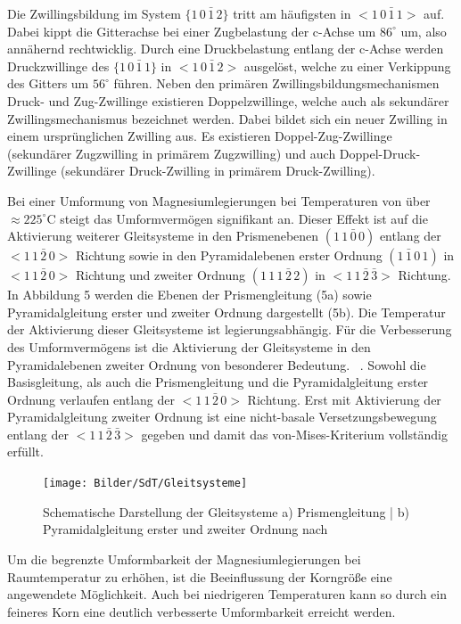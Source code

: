 Die Zwillingsbildung im System $\{1\,0\,\bar{1}\,2\}$ tritt am häufigsten in $<1\,0\,\bar{1}\,1>$ auf.
Dabei kippt die Gitterachse bei einer Zugbelastung der c-Achse um $86^\circ$ um, also annähernd rechtwicklig.
Durch eine Druckbelastung entlang der c-Achse werden Druckzwillinge des $\{1\,0\,\bar{1}\,1\}$ in $<1\,0\,\bar{1}\,2>$ ausgelöst, welche zu einer Verkippung des Gitters um $56^\circ$ führen.
Neben den primären Zwillingsbildungsmechanismen Druck- und Zug-Zwillinge existieren Doppelzwillinge, welche auch als sekundärer Zwillingsmechanismus bezeichnet werden.
Dabei bildet sich ein neuer Zwilling in einem ursprünglichen Zwilling aus.
Es existieren Doppel-Zug-Zwillinge (sekundärer Zugzwilling in primärem Zugzwilling) und auch Doppel-Druck-Zwillinge (sekundärer Druck-Zwilling in primärem Druck-Zwilling). \cite{Ullmann.2014}

Bei einer Umformung von Magnesiumlegierungen bei Temperaturen von über $\approx 225 ^\circ\text{C}$ steigt das Umformvermögen signifikant an.
Dieser Effekt ist auf die Aktivierung weiterer Gleitsysteme in den Prismenebenen $(1\,\bar{1\,0\,0})$ entlang der $<1\,1\,\bar{2}\,0>$ Richtung sowie in den Pyramidalebenen erster Ordnung $(1\,\bar{1}\,0\,1)$ in $<1\,1\,\bar{2}\,0>$ Richtung und zweiter Ordnung $(1\,1\,1\,\bar{2}\,2)$ in $<1\,1\,\bar{2}\,\bar{3}>$ Richtung.
In Abbildung 5 werden die Ebenen der Prismengleitung (5a) sowie Pyramidalgleitung erster und zweiter Ordnung dargestellt (5b).
Die Temperatur der Aktivierung dieser Gleitsysteme ist legierungsabhängig. \cite{Kammer.2000}
Für die Verbesserung des Umformvermögens ist die Aktivierung der Gleitsysteme in den Pyramidalebenen zweiter Ordnung von besonderer Bedeutung. \cite{En.2001,Doege.2010}~.
Sowohl die Basisgleitung, als auch die Prismengleitung und die Pyramidalgleitung erster Ordnung verlaufen entlang der $<1\,1\,\bar{2}\,0>$ Richtung.
Erst mit Aktivierung der Pyramidalgleitung zweiter Ordnung ist eine nicht-basale Versetzungsbewegung entlang der $<1\,1\,\bar{2}\,\bar{3}>$ gegeben und damit das von-Mises-Kriterium vollständig erfüllt. \cite{Schmidt.2011}

\begin{figure}[H]%
	\centering
	\texttt{[image: Bilder/SdT/Gleitsysteme]}
	\caption[Gleitsysteme]{Schematische Darstellung der Gleitsysteme a) Prismengleitung | b) Pyramidalgleitung erster und zweiter Ordnung nach \cite{Kammer.2000}}
	\label{z-d-anisotropie}
\end{figure}

Um die begrenzte Umformbarkeit der Magnesiumlegierungen bei Raumtemperatur zu erhöhen, ist die Beeinflussung der Korngröße eine angewendete Möglichkeit.
Auch bei niedrigeren Temperaturen kann so durch ein feineres Korn eine deutlich verbesserte Umformbarkeit erreicht werden. \cite{Tripathi.2017}

